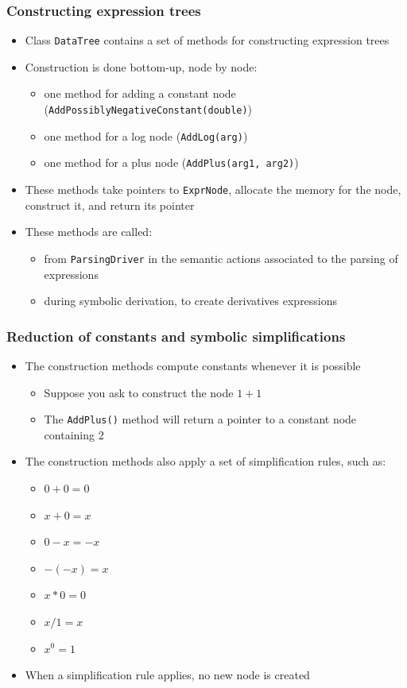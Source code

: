 \documentclass{beamer}
\begin{document}
\begin{frame}
  \frametitle{Constructing expression trees}
  \begin{itemize}
  \item Class \texttt{DataTree} contains a set of methods for constructing expression trees
  \item Construction is done bottom-up, node by node:
    \begin{itemize}
    \item one method for adding a constant node (\texttt{AddPossiblyNegativeConstant(double)})
    \item one method for a log node (\texttt{AddLog(arg)})
    \item one method for a plus node (\texttt{AddPlus(arg1, arg2)})
    \end{itemize}
  \item These methods take pointers to \texttt{ExprNode}, allocate the memory for the node, construct it, and return its pointer
  \item These methods are called:
    \begin{itemize}
    \item from \texttt{ParsingDriver} in the semantic actions associated to the parsing of expressions
    \item during symbolic derivation, to create derivatives expressions
    \end{itemize}
  \end{itemize}
\end{frame}

\begin{frame}
  \frametitle{Reduction of constants and symbolic simplifications}
  \begin{itemize}
  \item The construction methods compute constants whenever it is possible
    \begin{itemize}
    \item Suppose you ask to construct the node $1+1$
    \item The \texttt{AddPlus()} method will return a pointer to a constant node containing 2
    \end{itemize}
  \item The construction methods also apply a set of simplification rules, such as:
    \begin{itemize}
    \item $0+0=0$
    \item $x+0 = x$
    \item $0-x = -x$
    \item $-(-x) = x$
    \item $x*0 = 0$
    \item $x/1 = x$
    \item $x^0 = 1$
    \end{itemize}
  \item When a simplification rule applies, no new node is created
  \end{itemize}
\end{frame}
\end{document}

